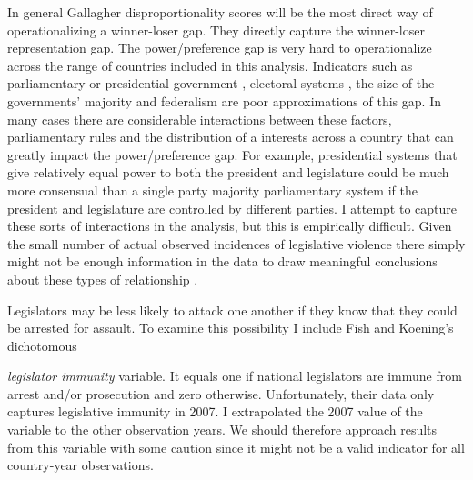 \documentclass[a4paper]{article}\usepackage{graphicx, color}
\begin{document}
{In general Gallagher disproportionality scores will be the most direct way of operationalizing a winner-loser gap. They directly capture the winner-loser representation gap. The power/preference gap is very hard to operationalize across the range of countries included in this analysis. Indicators such as parliamentary or presidential government \citep{Horowitz1990}, electoral systems \cite{Lijphart1994}, the size of the governments' majority and federalism are poor approximations of this gap. In many cases there are considerable interactions between these factors, parliamentary rules and the distribution of a interests across a country that can greatly impact the power/preference gap. For example, presidential systems that give relatively equal power to both the president and legislature could be much more consensual than a single party majority parliamentary system if the president and legislature are controlled by different parties. I attempt to capture these sorts of interactions in the analysis, but this is empirically difficult. Given the small number of actual observed incidences of legislative violence there simply might not be enough information in the data to draw meaningful conclusions about these types of relationship \citep[see][]{Brambor2006}.

Legislators may be less likely to attack one another if they know that they could be arrested for assault. To examine this possibility I include Fish and Koening's \citeyearpar{Fish2009} dichotomous {\emph{legislator immunity} variable. It equals one if national legislators are immune from arrest and/or prosecution and zero otherwise. Unfortunately, their data only captures legislative immunity in 2007. I extrapolated the 2007 value of the variable to the other observation years. We should therefore approach results from this variable with some caution since it might not be a valid indicator for all country-year observations.

}}
\end{document}
